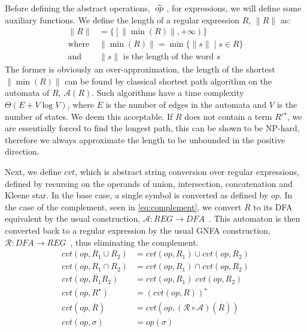 Before defining the abstract operations, $\;\widetilde{op}\;$, for expressions, we will define some auxiliary functions.
We define the length of a regular expression $R$, $\|R\|$ as:
\begin{align}\label{eq:r1}
    \|R\| & = \{ \left[ \|\min(R)\|, +\infty \right) \} \\
    \text{where } & \|\min(R)\| = \min\{ \|s\| \mid s \in R \} \\ \label{eq:r2}
    \text{and } & \|s\| \text{ is the length of the word $s$}
\end{align}
The former is obviously an over-approximation, the length of the shortest $\|\min(R)\|$ can be found by classical shortest path algorithm on the automata of $R$, $\mathcal{A}(R)$.
Such algorithms have a time complexity $\Theta(E + V \log V)$, where $E$ is the number of edges in the automata and $V$ is the number of states.
We deem this acceptable.
If $R$ does not contain a term $R'^\star$, we are essentially forced to find the longest path, this can be shown to be NP-hard, therefore we always approximate the length to be unbounded in the positive direction.

Next, we define $cvt$, which is abstract string conversion over regular expressions, defined by recursing on the operands of union, intersection, concatenation and Kleene star.
In the base case, a single symbol is converted as defined by $op$.
In the case of the complement, seen in \autoref{eq:complement}, we convert $\overline{R}$ to its DFA equivalent by the usual construction, $\mathcal{A}:REG\rightarrow DFA$~\cite{sipserbook}.
This automaton is then converted back to a regular expression by the usual GNFA construction, $\mathcal{R}: DFA\rightarrow REG$~\cite{sipserbook}, thus eliminating the complement.
\begin{align}
    cvt(op, R_1 \cup R_2) &= cvt(op, R_1) \cup cvt(op, R_2) \\
    cvt(op, R_1 \cap R_2) &= cvt(op, R_1) \cap cvt(op, R_2) \\
    cvt(op, R_1R_2) &= cvt(op, R_1) \; cvt(op, R_2) \\
    cvt(op, R^\star) &= (cvt(op, R))^\star \\
    cvt(op, \overline{R}) &= cvt(op, (\mathcal{R} \circ \mathcal{A}) (\overline{R})) \label{eq:complement} \\
    cvt(op, \sigma) &= op(\sigma)
\end{align}

